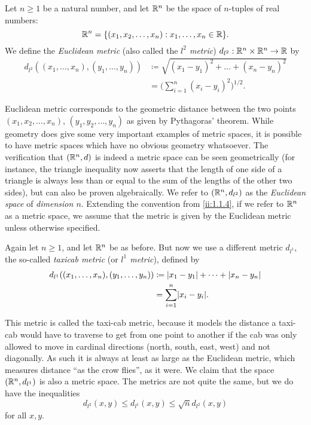 \begin{eg}\label{ii:1.1.6}
  Let \(n \geq 1\) be a natural number, and let \(\mathbb{R}^n\) be the space of \(n\)-tuples of real numbers:
  \[
    \R^n = \set{(x_1, x_2, \dots, x_n) : x_1, \dots, x_n \in \R}.
  \]
  We define the \emph{Euclidean metric} (also called the \emph{\(l^2\) metric}) \(d_{l^2} : \mathbb{R}^n \times\mathbb{R}^n \to \mathbb{R}\) by
  \begin{align*}
    d_{l^2}((x_1, \dots, x_n), (y_1, \dots, y_n)) & \coloneqq \sqrt{(x_1 - y_1)^2 + \dots + (x_n - y_n)^2} \\
                                                  & = \bigg(\sum_{i = 1}^n (x_i - y_i)^2\bigg)^{1 / 2}.
  \end{align*}
\end{eg}

\begin{note}
  Euclidean metric corresponds to the geometric distance between the two points \((x_1, x_2, \dots, x_n)\), \((y_1, y_2, \dots, y_n)\) as given by Pythagoras' theorem.
  While geometry does give some very important examples of metric spaces, it is possible to have metric spaces which have no obvious geometry whatsoever.
  The verification that \((\mathbb{R}^n, d)\) is indeed a metric space can be seen geometrically (for instance, the triangle inequality now asserts that the length of one side of a triangle is always less than or equal to the sum of the lengths of the other two sides), but can also be proven algebraically.
  We refer to \((\mathbb{R}^n , d_{l^2})\) as the \emph{Euclidean space} of \emph{dimension \(n\)}.
  Extending the convention from \cref{ii:1.1.4}, if we refer to \(\mathbb{R}^n\) as a metric space, we assume that the metric is given by the Euclidean metric unless otherwise specified.
\end{note}

\begin{eg}\label{ii:1.1.7}
  Again let \(n \geq 1\), and let \(\mathbb{R}^n\) be as before.
  But now we use a different metric \(d_{l^1}\), the so-called \emph{taxicab metric} (or \emph{\(l^1\) metric}), defined by
  \begin{align*}
    d_{l^1}((x_1, \dots, x_n), (y_1, \dots, y_n)) & \coloneqq \abs{x_1 - y_1} + \dots + \abs{x_n - y_n} \\
                                                  & = \sum_{i = 1}^n \abs{x_i - y_i}.
  \end{align*}
\end{eg}

\begin{note}
  This metric is called the taxi-cab metric, because it models the distance a taxi-cab would have to traverse to get from one point to another if the cab was only allowed to move in cardinal directions (north, south, east, west) and not diagonally.
  As such it is always at least as large as the Euclidean metric, which measures distance ``as the crow flies'', as it were.
  We claim that the space \((\mathbb{R}^n, d_{l^1})\) is also a metric space.
  The metrics are not quite the same, but we do have the inequalities
  \[
    d_{l^2}(x, y) \leq d_{l^1}(x, y) \leq \sqrt{n} d_{l^2}(x, y)
  \]
  for all \(x, y\).
\end{note}

